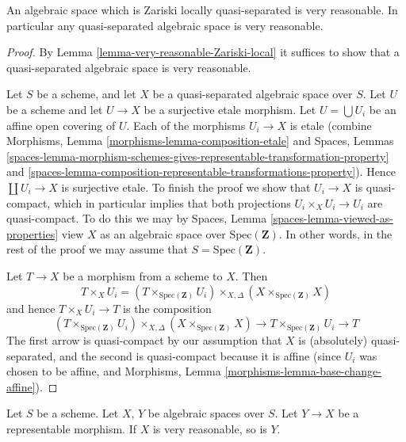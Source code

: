 \begin{lemma}
\label{lemma-quasi-separated-very-reasonable}
An algebraic space which is Zariski locally quasi-separated is very reasonable.
In particular any quasi-separated algebraic space is very reasonable.
\end{lemma}

\begin{proof}
By Lemma \ref{lemma-very-reasonable-Zariski-local}
it suffices to show that a quasi-separated algebraic space is very reasonable.

\medskip\noindent
Let $S$ be a scheme, and let $X$ be a quasi-separated algebraic space
over $S$. Let $U$ be a scheme and let $U \to X$ be a surjective etale
morphism. Let $U = \bigcup U_i$ be an affine open covering of $U$.
Each of the morphisms $U_i \to X$ is etale (combine
Morphisms, Lemma \ref{morphisms-lemma-composition-etale}
and
Spaces, Lemmas
\ref{spaces-lemma-morphism-schemes-gives-representable-transformation-property}
and
\ref{spaces-lemma-composition-representable-transformations-property}).
Hence $\coprod U_i \to X$ is surjective etale.
To finish the proof we show that $U_i \to X$ is quasi-compact, which
in particular implies that both projections $U_i \times_X U_i \to U_i$ are
quasi-compact. To do this we may by
Spaces, Lemma \ref{spaces-lemma-viewed-as-properties}
view $X$ as an algebraic space over $\text{Spec}(\mathbf{Z})$.
In other words, in the rest of the proof we may assume that
$S = \text{Spec}(\mathbf{Z})$.

\medskip\noindent
Let $T \to X$ be a morphism from a scheme to $X$. Then
$$
T \times_X U_i
=
(T \times_{\text{Spec}(\mathbf{Z})} U_i)
\times_{X, \Delta}
(X \times_{\text{Spec}(\mathbf{Z})} X)
$$
and hence $T \times_X U_i \to T$ is the composition
$$
(T \times_{\text{Spec}(\mathbf{Z})} U_i)
\times_{X, \Delta}
(X \times_{\text{Spec}(\mathbf{Z})} X)
\longrightarrow
T \times_{\text{Spec}(\mathbf{Z})} U_i
\longrightarrow T
$$
The first arrow is quasi-compact by our assumption that $X$ is
(absolutely) quasi-separated, and the second is quasi-compact because
it is affine (since $U_i$ was chosen to be affine, and
Morphisms, Lemma \ref{morphisms-lemma-base-change-affine}).
\end{proof}

\begin{lemma}
\label{lemma-representable-very-reasonable}
Let $S$ be a scheme.
Let $X$, $Y$ be algebraic spaces over $S$.
Let $Y \to X$ be a representable morphism.
If $X$ is very reasonable, so is $Y$.
\end{lemma}

